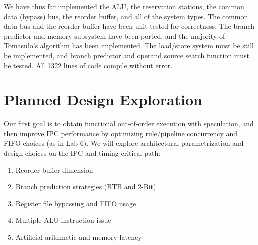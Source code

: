 \documentclass[12pt]{article}
\begin{document}
      We have thus far implemented the ALU, the reservation stations, the common data (bypass) bus,
      the reorder buffer, and all of the system types. The common data bus and the reorder buffer have
      been unit tested for correctness. The branch predictor and memory subsystem have been ported,
      and the majority of Tomasulo's algorithm has been implemented. The load/store system must be
      still be implemented, and branch predictor and operand source search function must be tested.
      All 1322 lines of code compile without error.

    \section{Planned Design Exploration}
    
    Our first goal is to obtain functional out-of-order execution with speculation, and then improve IPC performance by optimizing rule/pipeline concurrency and FIFO choices (as in Lab 6). We will explore architectural parametrization and design choices on the IPC and timing critical path:    
    \begin{enumerate}
        \item Reorder buffer dimension
        \item Branch prediction strategies (BTB and 2-Bit)
        \item Register file bypassing and FIFO usage
        \item Multiple ALU instruction issue
        \item Artificial arithmetic and memory latency
    \end{enumerate}
    
    
    
    

 
\end{document}
